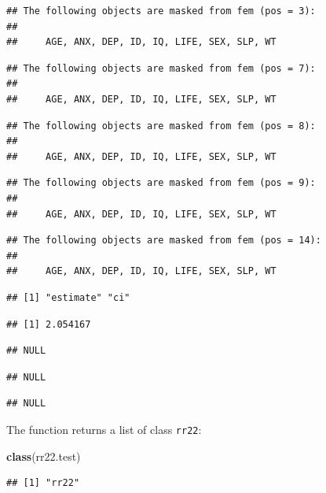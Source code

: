 \documentclass[]{book}
\newenvironment{Shaded}{\begin{snugshade}}{\end{snugshade}}
\newcommand{\KeywordTok}[1]{\textcolor[rgb]{0.13,0.29,0.53}{\textbf{#1}}}
\newcommand{\NormalTok}[1]{#1}
\theoremstyle{definition}
\theoremstyle{definition}
\theoremstyle{definition}
\theoremstyle{remark}
\begin{document}
\begin{verbatim}
## The following objects are masked from fem (pos = 3):
## 
##     AGE, ANX, DEP, ID, IQ, LIFE, SEX, SLP, WT
\end{verbatim}

\begin{verbatim}
## The following objects are masked from fem (pos = 7):
## 
##     AGE, ANX, DEP, ID, IQ, LIFE, SEX, SLP, WT
\end{verbatim}

\begin{verbatim}
## The following objects are masked from fem (pos = 8):
## 
##     AGE, ANX, DEP, ID, IQ, LIFE, SEX, SLP, WT
\end{verbatim}

\begin{verbatim}
## The following objects are masked from fem (pos = 9):
## 
##     AGE, ANX, DEP, ID, IQ, LIFE, SEX, SLP, WT
\end{verbatim}

\begin{verbatim}
## The following objects are masked from fem (pos = 14):
## 
##     AGE, ANX, DEP, ID, IQ, LIFE, SEX, SLP, WT
\end{verbatim}

\begin{verbatim}
## [1] "estimate" "ci"
\end{verbatim}

\begin{verbatim}
## [1] 2.054167
\end{verbatim}

\begin{verbatim}
## NULL
\end{verbatim}

\begin{verbatim}
## NULL
\end{verbatim}

\begin{verbatim}
## NULL
\end{verbatim}

The function returns a list of class \texttt{rr22}:

\begin{Shaded}
\begin{Highlighting}[]
\KeywordTok{class}\NormalTok{(rr22.test)}
\end{Highlighting}
\end{Shaded}

\begin{verbatim}
## [1] "rr22"
\end{verbatim}
\end{document}
